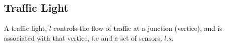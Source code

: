 \subsection{Traffic Light}
A traffic light, $l$ controls the flow of traffic at a junction (vertice), and is associated with that vertice, $l.v$ and a set of sensors, $l.s$.

\begin{comment}
Now, we can describe the set of traffic lights as a triple of a vertice, a set of connections with a phase and a set of sensors.
\[
\mathcal{L}_{(V,E)} = \{(v, c, s)\mid v\in V, c\subseteq \mathcal{C}_{(V,E)}, s\in \mathcal{S}\}
\]
\end{comment}





